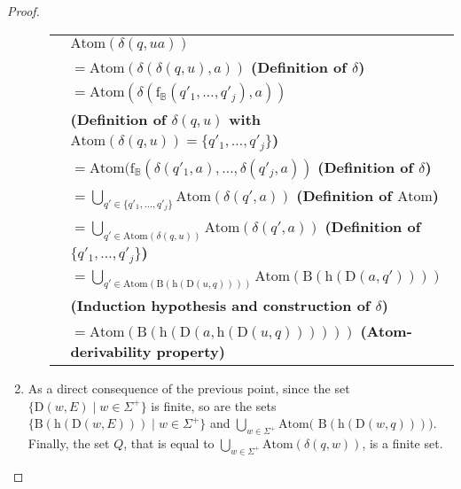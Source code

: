 \documentclass{article}
\begin{document}
\begin{proof}
\begin{enumerate}
\begin{enumerate}
      
         \begin{tabular}{l@{\ }l}
          & $\mathrm{Atom}(\delta(q,ua))$\\
          & $=\mathrm{Atom}(\delta(\delta(q,u),a))$ \hfill\textbf{(Definition of $\delta$)}\\
          & $=\mathrm{Atom}(\delta(\mathrm{f}_\mathbb{B}(q'_1,\ldots,q'_j),a))$ \\ & \hfill\textbf{(Definition of $\delta(q,u)$ with $\mathrm{Atom}(\delta(q,u))=\{q'_1,\ldots,q'_j\}$)}\\
          & $=\mathrm{Atom}(\mathrm{f}_\mathbb{B}(\delta(q'_1,a),\ldots,\delta(q'_j,a))$ \hfill\textbf{(Definition of $\delta$)}\\
          & $=\bigcup_{q'\in\{q'_1,\ldots,q'_j\}} \mathrm{Atom}(\delta(q',a))$ \hfill\textbf{(Definition of $\mathrm{Atom}$)}\\
& $=\bigcup_{q' \in \mathrm{Atom}(\delta(q,u))} \mathrm{Atom}(\delta(q',a))$ \hfill\textbf{(Definition of $\{q'_1,\ldots,q'_j\}$)}\\
          & $=\bigcup_{q' \in \mathrm{Atom}(\mathrm{B}(\mathrm{h}(\mathrm{D}(u,q))))} \mathrm{Atom}(\mathrm{B}(\mathrm{h}(\mathrm{D}(a,q'))))$\\ &  \hfill\textbf{(Induction hypothesis and construction of $\delta$)}\\
          & $=\mathrm{Atom}(\mathrm{B}(\mathrm{h}(\mathrm{D}(a,\mathrm{h}(\mathrm{D}(u,q))))))$ \hfill\textbf{(Atom-derivability property)}\\
         \end{tabular}
         
        
    \end{enumerate}
    \item As a direct consequence of the previous point, since the set $\{\mathrm{D}(w,E)\mid w\in\Sigma^+\}$ is finite, so are the sets $\{\mathrm{B}(\mathrm{h}(\mathrm{D}(w,E)))\mid w\in\Sigma^+\}$ and $\bigcup_{w\in\Sigma^+} \mathrm{Atom}($ $\mathrm{B}(\mathrm{h}(\mathrm{D}(w,q))))$. Finally, the set $Q$, that is equal to $\bigcup_{w\in\Sigma^+} \mathrm{Atom}(\delta(q,w))$, is a finite set.
    \end{enumerate}
\end{proof}
  
\end{document}
